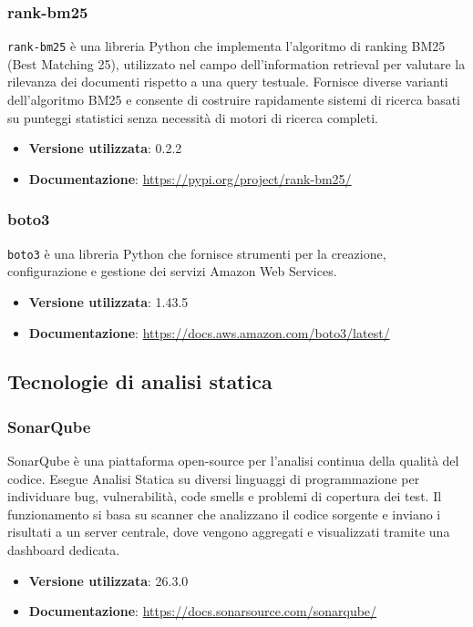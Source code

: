 \documentclass[a4paper,12pt]{article}
\begin{document}
\subsubsection{rank-bm25}
\texttt{rank-bm25} è una libreria Python che implementa l'algoritmo di ranking BM25 (Best Matching 25), utilizzato nel campo dell'information retrieval per valutare la rilevanza dei documenti rispetto a una query testuale. Fornisce diverse varianti dell'algoritmo BM25 e consente di costruire rapidamente sistemi di ricerca basati su punteggi statistici senza necessità di motori di ricerca completi.
\begin{itemize}
    \item \textbf{Versione utilizzata}: 0.2.2
    \item \textbf{Documentazione}: \url{https://pypi.org/project/rank-bm25/}
\end{itemize}

\subsubsection{boto3}
\texttt{boto3} è una libreria Python che fornisce strumenti per la creazione, configurazione e gestione dei servizi Amazon Web Services.
\begin{itemize}
    \item \textbf{Versione utilizzata}: 1.43.5
    \item \textbf{Documentazione}: \url{https://docs.aws.amazon.com/boto3/latest/}
\end{itemize}

\subsection{Tecnologie di analisi statica} \label{subsec:tecnologie_analisi_statica}
\subsubsection{SonarQube}
SonarQube è una piattaforma open-source per l'analisi continua della qualità del codice. Esegue Analisi Statica su diversi linguaggi di programmazione per individuare bug, vulnerabilità, code smells e problemi di copertura dei test. Il funzionamento si basa su scanner che analizzano il codice sorgente e inviano i risultati a un server centrale, dove vengono aggregati e visualizzati tramite una dashboard dedicata.
\begin{itemize}
    \item \textbf{Versione utilizzata}: 26.3.0
    \item \textbf{Documentazione}: \url{https://docs.sonarsource.com/sonarqube/}
\end{itemize}
\end{document}
